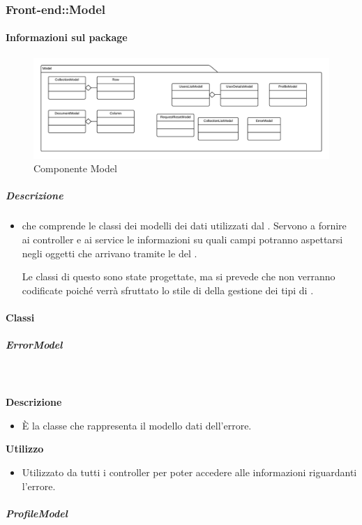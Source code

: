 	\subsubsection{Front-end::Model}
	\paragraph{Informazioni sul package} 
		\begin{figure}[H] 
			\begin{center} 
				\includegraphics[width=\textwidth]{uml/package/Front-end::Model.png}  
				\caption{Componente Model}
			\end{center}  
		\end{figure} 
	\subparagraph{Descrizione} 
		\begin{itemize}
		\item[]  che comprende le classi dei modelli dei dati utilizzati dal . Servono a fornire ai controller e ai service le informazioni su quali campi potranno aspettarsi negli oggetti che arrivano tramite le  del .

Le classi di questo  sono state progettate, ma si prevede che non verranno codificate poiché verrà sfruttato lo stile di  della gestione dei tipi di .
		\end{itemize} 
		\paragraph{Classi}
			\subparagraph{ErrorModel}
				
				\textbf{\\ \\ Descrizione} 
					\begin{itemize}
						\item[] È la classe che rappresenta il modello dati dell'errore.
					\end{itemize}      
				\textbf{Utilizzo}  
					\begin{itemize}
						\item[] Utilizzato da tutti i controller per poter accedere alle informazioni riguardanti l'errore.
					\end{itemize}
			\subparagraph{ProfileModel}
				
